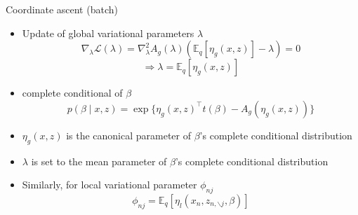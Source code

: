 \documentclass[aspectratio=169]{beamer}
\begin{document}
\begin{frame}{Coordinate ascent (batch)}
    \begin{itemize}
        \item Update of global variational parameters $\lambda$
         \[\nabla_{\lambda}\mathcal{L}(\lambda) = \nabla^2_{\lambda}A_g(\lambda)(\mathbb{E}_q[\eta_g(x,z)] - \lambda) = 0\]
            \[\Rightarrow \lambda = \mathbb{E}_q[\eta_g(x,z)]\]
        \item complete conditional of $\beta$
        \[p(\beta \mid x,z) = \exp\{\eta_g(x,z)^{\top}t(\beta) - A_g(\eta_g(x,z))\}\]
            \item $\eta_g(x,z)$ is the canonical parameter of $\beta$'s complete conditional distribution
        \item $\lambda$ is set to the mean parameter of $\beta$'s complete conditional distribution
         \item Similarly, for local variational parameter $\phi_{nj}$
        \[\phi_{nj} = \mathbb{E}_q[\eta_l(x_n,z_{n,\backslash j}, \beta)]\]
    \end{itemize}
\end{frame}

\end{document}
